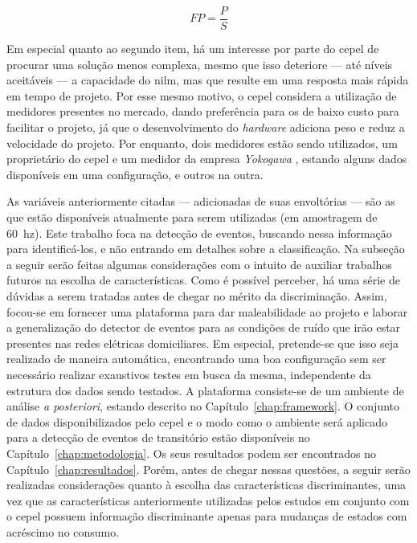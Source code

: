 \begin{equation} \label{eq:fp}
FP = \frac{P}{S}
\end{equation}

Em especial quanto ao segundo item, há um interesse por parte do
\gls{cepel} de procurar uma solução menos complexa, mesmo
que isso deteriore --- até níveis aceitáveis --- a capacidade do
\gls{nilm}, mas que resulte em uma resposta mais rápida em tempo de
projeto. Por esse mesmo motivo, o \gls{cepel} considera a utilização
de medidores presentes no mercado, dando preferência para os de baixo
custo para facilitar o projeto, já que o desenvolvimento do
\emph{hardware} adiciona peso e reduz a velocidade do projeto. Por
enquanto, dois medidores estão sendo utilizados, um proprietário do
\acs{cepel} e um medidor da empresa \emph{Yokogawa}
\cite{yokogawa_medidor}, estando alguns dados disponíveis em uma
configuração, e outros na outra.

As variáveis anteriormente citadas --- adicionadas de suas envoltórias
--- são as que estão disponíveis atualmente para serem utilizadas (em
amostragem de 60~\acs{hz}).  Este trabalho foca na detecção de
eventos, buscando nessa informação para identificá-los, e não entrando
em detalhes sobre a classificação.  Na subseção a seguir serão feitas
algumas considerações com o intuito de auxiliar trabalhos futuros na
escolha de características. Como é possível perceber, há uma série de
dúvidas a serem tratadas antes de chegar no mérito da discriminação.
Assim, focou-se em fornecer uma plataforma para dar maleabilidade ao
projeto e laborar a generalização do detector de eventos para as
condições de ruído que irão estar presentes nas redes elétricas
domiciliares. Em especial, pretende-se que isso seja realizado de
maneira automática, encontrando uma boa configuração sem ser
necessário realizar exaustivos testes em busca da mesma, independente
da estrutura dos dados sendo testados. A plataforma consiste-se de um
ambiente de análise \emph{a posteriori}, estando descrito no
Capítulo~\ref{chap:framework}. O conjunto de dados disponibilizados
pelo \acs{cepel} e o modo como o ambiente será aplicado para a
detecção de eventos de transitório estão disponíveis no
Capítulo~\ref{chap:metodologia}. Os seus resultados podem ser
encontrados no Capítulo~\ref{chap:resultados}. Porém, antes de chegar
nessas questões, a seguir serão realizadas considerações quanto à
escolha das características discriminantes, uma vez que as
características anteriormente utilizadas pelos estudos em conjunto com
o \acs{cepel} possuem informação discriminante apenas para mudanças de
estados com acréscimo no consumo.

